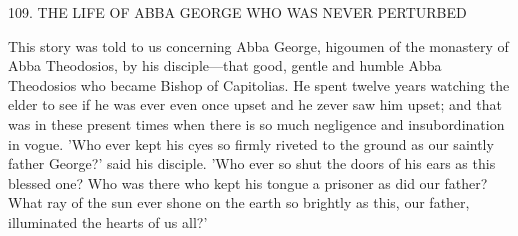 109.
THE LIFE OF ABBA GEORGE
WHO WAS NEVER PERTURBED

This story was told to us concerning Abba George, higoumen of the
monastery of Abba Theodosios, by his disciple—that good, gentle
and humble Abba Theodosios who became Bishop of Capitolias.
He
spent twelve years watching the elder to see if he was ever even once
upset and he zever saw him upset; and that was in these present
times when there is so much negligence and insubordination in
vogue.
'Who ever kept his cyes so firmly riveted to the ground as
our saintly father George?' said his disciple.
'Who ever so shut the
doors of his ears as this blessed one? Who was there who kept his
tongue a prisoner as did our father? What ray of the sun ever shone
on the earth so brightly as this, our father, illuminated the hearts of
us all?'

